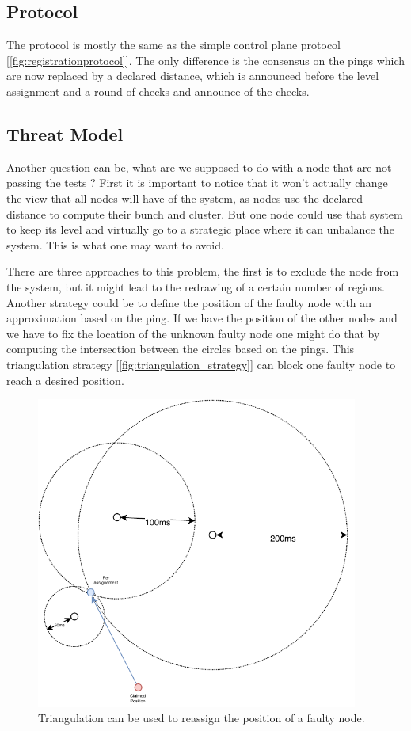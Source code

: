 \documentclass[a4paper,11pt,oneside]{report}
\begin{document}
\subsection{Protocol}
The protocol is mostly the same as the simple control plane protocol
[\autoref{fig:registrationprotocol}]. The only difference is the consensus on
the pings which are now replaced by a declared distance, which is announced
before the level assignment and a round of checks and announce of the checks. 

\subsection{Threat Model}
Another question can be, what are we supposed to do with a node that are not
passing the tests ? First it is important to notice that it won't actually
change the view that all nodes will have of the system, as nodes use the
declared distance to compute their bunch and cluster. But one node could use
that system to keep its level and virtually go to a strategic place where it can unbalance the system.
This is what one may want to avoid. 

There are three approaches to this problem, the first is to exclude the node
from the system, but it might lead to the redrawing of a certain number of
regions. Another strategy could be to define the
position of the faulty node with an approximation based on the ping. If we have
the position of the other nodes and we have to fix the location of the unknown
faulty node one might do that by computing the intersection between the circles
based on the pings. This triangulation strategy
[\autoref{fig:triangulation_strategy}] can block one faulty node to reach a
desired position. 

\begin{figure}[!h] 
\centering
\includegraphics[width=300pt]{figures/triangulation_strategy}
\caption{Triangulation can be used to reassign the position of a faulty node.  }
\label{fig:triangulation_strategy}
\end{figure}
\end{document}
